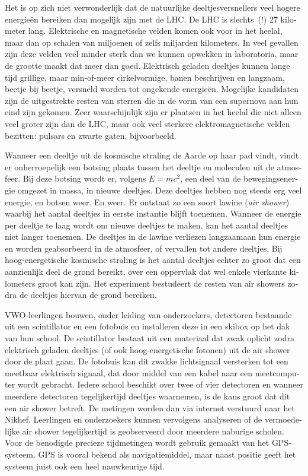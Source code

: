 \begin{otherlanguage}{dutch}
Het is op zich niet verwonderlijk dat de natuurlijke deeltjesversnellers
veel hogere energieën bereiken dan mogelijk zijn met de LHC.  De LHC is
slechts~(!) 27 kilometer lang.  Elektrische en magnetische velden komen
ook voor in het heelal, maar dan op schalen van miljoenen of zelfs
miljarden kilometers.  In veel gevallen zijn deze velden veel minder sterk
dan we kunnen opwekken in laboratoria, maar de grootte maakt dat meer dan
goed.  Elektrisch geladen deeltjes kunnen lange tijd grillige, maar
min-of-meer cirkelvormige, banen beschrijven en langzaam, beetje bij
beetje, versneld worden tot ongekende energieën.  Mogelijke kandidaten
zijn de uitgestrekte resten van sterren die in de vorm van een supernova
aan hun eind zijn gekomen.  Zeer waarschijnlijk zijn er plaatsen in het
heelal die niet alleen veel groter zijn dan de LHC, maar ook veel sterkere
elektromagnetische velden bezitten: pulsars en zwarte gaten, bijvoorbeeld.

Wanneer een deeltje uit de kosmische straling de Aarde op haar pad vindt,
vindt er onherroepelijk een botsing plaats tussen het deeltje en moleculen
uit de atmosfeer.  Bij deze botsing wordt er, volgens $E = mc^2$, een deel
van de bewegingsenergie omgezet in massa, in nieuwe deeltjes.  Deze
deeltjes hebben nog steeds erg veel energie, en botsen weer.  En weer.  Er
ontstaat zo een soort lawine (\emph{air shower}) waarbij het aantal
deeltjes in eerste instantie blijft toenemen.  Wanneer de energie per
deeltje te laag wordt om nieuwe deeltjes te maken, kan het aantal deeltjes
niet langer toenemen.  De deeltjes in de lawine verliezen langzaamaan hun
energie en worden geabsorbeerd in de atmosfeer, of vervallen tot andere
deeltjes.  Bij hoog-energetische kosmische straling is het aantal deeltjes
echter zo groot dat een aanzienlijk deel de grond bereikt, over een
oppervlak dat wel enkele vierkante kilometers groot kan zijn.  Het
\hisparc experiment bestudeert de resten van air showers zodra de deeltjes
hiervan de grond bereiken.

VWO-leerlingen bouwen, onder leiding van onderzoekers, detectoren
bestaande uit een scintillator en een fotobuis en installeren deze in een
skibox op het dak van hun school.  De scintillator bestaat uit een
materiaal dat zwak oplicht zodra elektrisch geladen deeltjes (of ook
hoog-energetische fotonen) uit de air shower door de plaat gaan.  De
fotobuis kan dit zwakke lichtsignaal versterken tot een meetbaar
elektrisch signaal, dat door middel van een kabel naar een meetcomputer
wordt gebracht.  Iedere school beschikt over twee of vier detectoren en
wanneer meerdere detectoren tegelijkertijd deeltjes waarnemen, is de kans
groot dat dit een air shower betreft.  De metingen worden dan via internet
verstuurd naar het Nikhef.  Leerlingen en onderzoekers kunnen vervolgens
analyseren of de vermoedelijke air shower tegelijkertijd is geobserveerd
door meerdere naburige scholen.  Voor de benodigde precieze tijdmetingen
wordt gebruik gemaakt van het GPS-systeem.  GPS is vooral bekend als
navigatiemiddel, maar naast positie geeft het systeem juist ook een heel
nauwkeurige tijd.


\end{otherlanguage}
